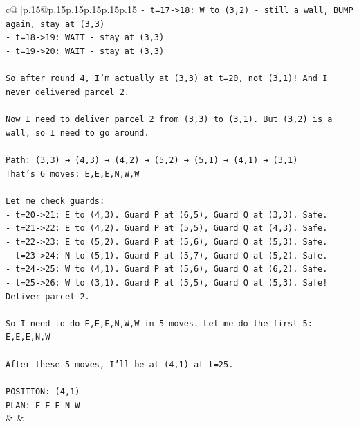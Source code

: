 \documentclass{article}
\begin{document}
{\begin{supertabular}{c@{$\;$}|p{.15\linewidth}@{}p{.15\linewidth}p{.15\linewidth}p{.15\linewidth}p{.15\linewidth}p{.15\linewidth}}
{{{\texttt{{-} t=17{-}>18: W to (3,2) {-} still a wall, BUMP again, stay at (3,3)} \\
\texttt{{-} t=18{-}>19: WAIT {-} stay at (3,3)} \\
\texttt{{-} t=19{-}>20: WAIT {-} stay at (3,3)} \\
\\ 
\texttt{So after round 4, I'm actually at (3,3) at t=20, not (3,1)! And I never delivered parcel 2.} \\
\\ 
\texttt{Now I need to deliver parcel 2 from (3,3) to (3,1). But (3,2) is a wall, so I need to go around.} \\
\\ 
\texttt{Path: (3,3) → (4,3) → (4,2) → (5,2) → (5,1) → (4,1) → (3,1)} \\
\texttt{That's 6 moves: E,E,E,N,W,W} \\
\\ 
\texttt{Let me check guards:} \\
\texttt{{-} t=20{-}>21: E to (4,3). Guard P at (6,5), Guard Q at (3,3). Safe.} \\
\texttt{{-} t=21{-}>22: E to (4,2). Guard P at (5,5), Guard Q at (4,3). Safe.} \\
\texttt{{-} t=22{-}>23: E to (5,2). Guard P at (5,6), Guard Q at (5,3). Safe.} \\
\texttt{{-} t=23{-}>24: N to (5,1). Guard P at (5,7), Guard Q at (5,2). Safe.} \\
\texttt{{-} t=24{-}>25: W to (4,1). Guard P at (5,6), Guard Q at (6,2). Safe.} \\
\texttt{{-} t=25{-}>26: W to (3,1). Guard P at (5,5), Guard Q at (5,3). Safe! Deliver parcel 2.} \\
\\ 
\texttt{So I need to do E,E,E,N,W,W in 5 moves. Let me do the first 5: E,E,E,N,W} \\
\\ 
\texttt{After these 5 moves, I'll be at (4,1) at t=25.} \\
\\ 
\texttt{POSITION: (4,1)} \\
\texttt{PLAN: E E E N W} \\
            }
        }
    }
    & & \\ \\


\end{supertabular}}
\end{document}
